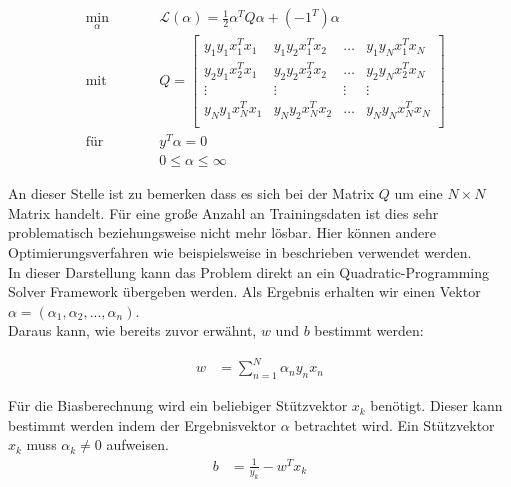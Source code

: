 \documentclass[a4paper,11pt,twoside]{scrreprt}
\newcommand{\Lagr}{\mathcal{L}}
\begin{document}
\begin{subequations} \label{qp1}
	\begin{alignat}{2}
		&\!\min_{\alpha}        &\qquad& \Lagr(\alpha) = \frac{1}{2} \alpha^{T} Q \alpha + (-1^T) \alpha \label{eq:qp1}\\
		&\text{mit} &      & Q = \begin{bmatrix} 
			y_{1}y_{1}x_{1}^{T}x_{1} & y_{1}y_{2}x_{1}^{T}x_{2} & \dots & y_{1}y_{N}x_{1}^{T}x_{N}\\
			y_{2}y_{1}x_{2}^{T}x_{1} & y_{2}y_{2}x_{2}^{T}x_{2} & \dots & y_{2}y_{N}x_{2}^{T}x_{N}\\
			\vdots & \vdots & \vdots & \vdots\\
			y_{N}y_{1}x_{N}^{T}x_{1} & y_{N}y_{2}x_{N}^{T}x_{2} & \dots & y_{N}y_{N}x_{N}^{T}x_{N}\\ 
	\end{bmatrix}\\
&\text{für} & & y^{T} \alpha = 0\\
& & & 0 \leq \alpha \leq \infty
	\end{alignat}
\end{subequations}

An dieser Stelle ist zu bemerken dass es sich bei der Matrix $Q$ um eine $N \times N$ Matrix handelt. Für eine große Anzahl an Trainingsdaten ist dies sehr problematisch beziehungsweise nicht mehr lösbar. Hier können andere Optimierungsverfahren wie beispielsweise in \textcite{platt_sequential_1998} beschrieben verwendet werden. \\


In dieser Darstellung kann das Problem direkt an ein Quadratic-Programming Solver Framework übergeben werden. Als Ergebnis erhalten wir einen Vektor $\alpha = (\alpha_{1}, \alpha_{2}, ..., \alpha_{n})$. \\

Daraus kann, wie bereits zuvor erwähnt, $w$ und $b$ bestimmt werden:

\begin{equation} \label{weights_calc_qp}
	\begin{aligned}
		w &= \sum_{n=1}^{N} \alpha_{n} y_{n} x_{n}
	\end{aligned}
\end{equation}

Für die Biasberechnung wird ein beliebiger Stützvektor $x_{k}$ benötigt. Dieser kann bestimmt werden indem der Ergebnisvektor $\alpha$ betrachtet wird. Ein Stützvektor $x_{k}$ muss $\alpha_{k} \neq 0$ aufweisen.
\begin{equation} \label{bias_calc_qp}
	\begin{aligned}
		b &= \frac{1}{y_{k}} - w^{T} x_{k}
	\end{aligned}
\end{equation}
\end{document}
